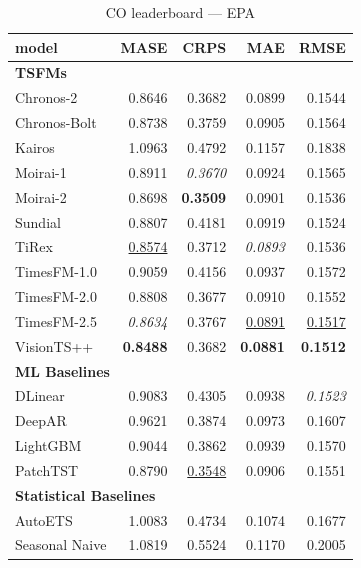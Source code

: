 \begin{table}[H]
\caption{CO leaderboard --- EPA}
\centering
\begin{small}
\begin{tabular}{lrrrr}
\toprule
model & MASE & CRPS & MAE & RMSE \\
\midrule
\multicolumn{5}{l}{\textbf{TSFMs}} \\
Chronos-2 & 0.8646 & 0.3682 & 0.0899 & 0.1544 \\
Chronos-Bolt & 0.8738 & 0.3759 & 0.0905 & 0.1564 \\
Kairos & 1.0963 & 0.4792 & 0.1157 & 0.1838 \\
Moirai-1 & 0.8911 & \textit{0.3670} & 0.0924 & 0.1565 \\
Moirai-2 & 0.8698 & \textbf{0.3509} & 0.0901 & 0.1536 \\
Sundial & 0.8807 & 0.4181 & 0.0919 & 0.1524 \\
TiRex & \underline{0.8574} & 0.3712 & \textit{0.0893} & 0.1536 \\
TimesFM-1.0 & 0.9059 & 0.4156 & 0.0937 & 0.1572 \\
TimesFM-2.0 & 0.8808 & 0.3677 & 0.0910 & 0.1552 \\
TimesFM-2.5 & \textit{0.8634} & 0.3767 & \underline{0.0891} & \underline{0.1517} \\
VisionTS++ & \textbf{0.8488} & 0.3682 & \textbf{0.0881} & \textbf{0.1512} \\
\midrule
\multicolumn{5}{l}{\textbf{ML Baselines}} \\
DLinear & 0.9083 & 0.4305 & 0.0938 & \textit{0.1523} \\
DeepAR & 0.9621 & 0.3874 & 0.0973 & 0.1607 \\
LightGBM & 0.9044 & 0.3862 & 0.0939 & 0.1570 \\
PatchTST & 0.8790 & \underline{0.3548} & 0.0906 & 0.1551 \\
\midrule
\multicolumn{5}{l}{\textbf{Statistical Baselines}} \\
AutoETS & 1.0083 & 0.4734 & 0.1074 & 0.1677 \\
Seasonal Naive & 1.0819 & 0.5524 & 0.1170 & 0.2005 \\
\bottomrule
\end{tabular}
\end{small}
\end{table}